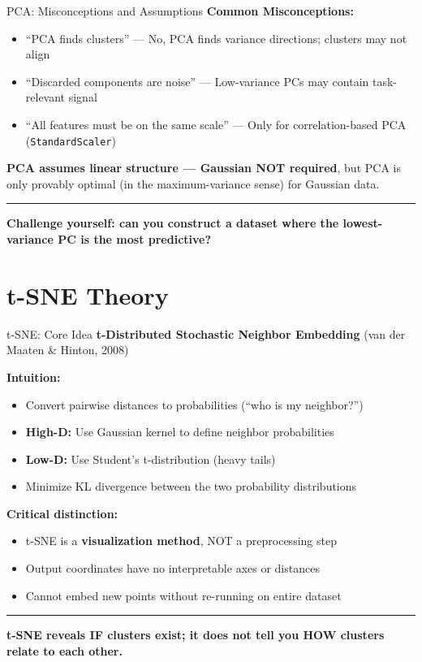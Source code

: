 \documentclass[8pt,aspectratio=169]{beamer}
\newcommand{\bottomnote}[1]{%
\vfill
\vspace{-2mm}
\textcolor{mllavender2}{\rule{\textwidth}{0.4pt}}
\vspace{1mm}
\footnotesize
\textbf{#1}
}
\newcommand{\highlight}[1]{\textcolor{mlorange}{\textbf{#1}}}
\begin{document}
\begin{frame}[t]{PCA: Misconceptions and Assumptions}
\textbf{Common Misconceptions:}
\begin{itemize}
  \item ``PCA finds clusters'' --- No, PCA finds variance directions; clusters may not align
  \item ``Discarded components are noise'' --- Low-variance PCs may contain task-relevant signal
  \item ``All features must be on the same scale'' --- Only for correlation-based PCA (\texttt{StandardScaler})
\end{itemize}

\vspace{0.3em}
\highlight{PCA assumes linear structure --- Gaussian NOT required}, but PCA is only provably optimal (in the maximum-variance sense) for Gaussian data.
\bottomnote{Challenge yourself: can you construct a dataset where the lowest-variance PC is the most predictive?}
\end{frame}

\section{t-SNE Theory}

\begin{frame}[t]{t-SNE: Core Idea}
\textbf{t-Distributed Stochastic Neighbor Embedding} (van der Maaten \& Hinton, 2008)

\vspace{0.3em}
\textbf{Intuition:}
\begin{itemize}
  \item Convert pairwise distances to probabilities (``who is my neighbor?'')
  \item \textbf{High-D:} Use Gaussian kernel to define neighbor probabilities
  \item \textbf{Low-D:} Use Student's t-distribution (heavy tails)
  \item Minimize KL divergence between the two probability distributions
\end{itemize}

\vspace{0.3em}
\textbf{Critical distinction:}
\begin{itemize}
  \item t-SNE is a \highlight{visualization method}, NOT a preprocessing step
  \item Output coordinates have no interpretable axes or distances
  \item Cannot embed new points without re-running on entire dataset
\end{itemize}
\bottomnote{t-SNE reveals IF clusters exist; it does not tell you HOW clusters relate to each other.}
\end{frame}
\end{document}
